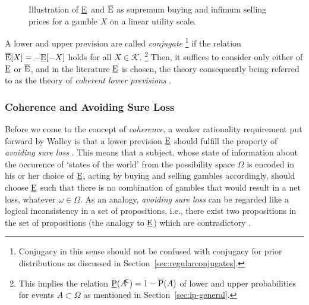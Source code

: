 \begin{figure}
\centering
{}
\caption{\label{fig:pricesforgambles}%
Illustration of \underline{E}\ and $\overline{\operatorname{E}}$ as supremum buying and infimum selling prices for a gamble $X$ on a linear utility scale.}
\end{figure}

A lower and upper prevision are called \emph{conjugate}%
\footnote{Conjugacy in this sense should not be confused
with conjugacy for prior distributions as discussed in Section~\ref{sec:regularconjugates}.}
if the relation $\overline{\operatorname{E}}[X] = -\underline{\operatorname{E}}[-X]$ holds for all $X \in \mathcal{K}$.%
\footnote{This implies the relation $\underline{\operatorname{P}}(A^{{\mbox{\!\scriptsize\textsf{C}}}}) = 1 - \overline{\operatorname{P}}(A)$
of lower and upper probabilities for events $A \subset \Omega$
as mentioned in Section~\ref{sec:ip-general}.}
Then, it suffices to consider only either of $\underline{\operatorname{E}}$ or $\overline{\operatorname{E}}$,
and in the literature $\underline{\operatorname{E}}$ is chosen,
the theory consequently being referred to as the theory of
\emph{coherent lower previsions} \parencite[see, e.g.,][\S 3.2]{itip}.

\subsubsection{Coherence and Avoiding Sure Loss}

Before we come to the concept of \emph{coherence},
a weaker rationality requirement put forward by Walley is
that a lower prevision $\underline{\operatorname{E}}$ should fulfill the property of
\emph{avoiding sure loss} \parencite[\S 2.4]{1991:walley}.
This means that a subject, whose state of information about the
occurence of `states of the world' from the possibility space $\Omega$
is encoded in his or her choice of $\underline{\operatorname{E}}$,
acting by buying and selling gambles accordingly,
should choose $\underline{\operatorname{E}}$ such that there is no combination of gambles
that would result in a net loss, whatever $\omega \in \Omega$.
As an analogy, \emph{avoiding sure loss} can be regarded
like a logical inconsistency in a set of propositions,
i.e., there exist two propositions in the set of propositions
(the analogy to $\underline{\operatorname{E}}$) which are contradictory
\parencite[\S 2.4, footnote~1]{1991:walley}.


